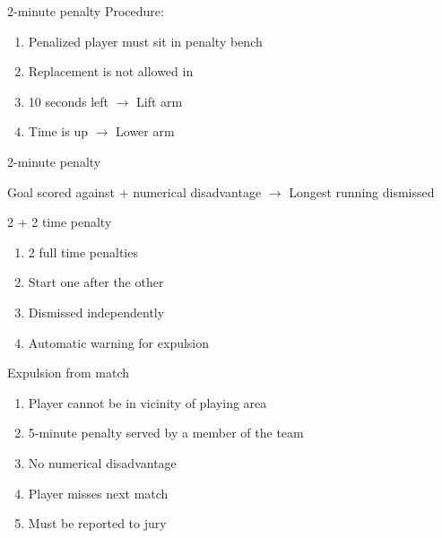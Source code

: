 \begin{frame}{2-minute penalty}
    Procedure:

    \begin{enumerate}
        \item Penalized player must sit in penalty bench
        \item Replacement is not allowed in
        \item 10 seconds left $\rightarrow$ Lift arm
        \item Time is up $\rightarrow$ Lower arm
    \end{enumerate}
\end{frame}

\begin{frame}{2-minute penalty}
    \begin{center}
        Goal scored against + numerical disadvantage $\rightarrow$ Longest running dismissed
    \end{center}
\end{frame}

\begin{frame}{2 + 2 time penalty}
    \begin{enumerate}
        \item 2 full time penalties
        \item Start one after the other
        \item Dismissed independently
        \item Automatic warning for expulsion
    \end{enumerate}
\end{frame}

\begin{frame}{Expulsion from match}
    \begin{enumerate}
        \item Player cannot be in vicinity of playing area
        \item 5-minute penalty served by a member of the team
        \item No numerical disadvantage
        \item Player misses next match
        \item Must be reported to jury
    \end{enumerate}
\end{frame}